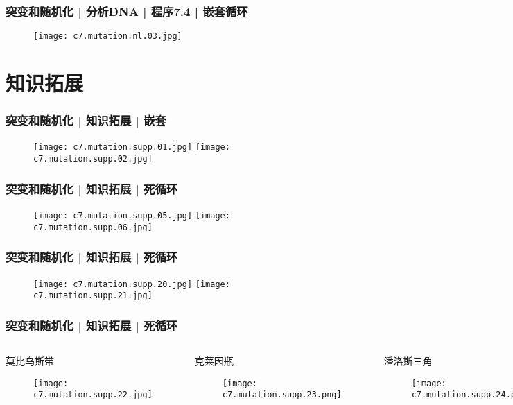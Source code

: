 \begin{frame}
  \frametitle{突变和随机化 | 分析DNA | 程序7.4 | 嵌套循环}
  \begin{figure}
    \centering
    \texttt{[image: c7.mutation.nl.03.jpg]}
  \end{figure}
\end{frame}

\section{知识拓展}
\begin{frame}
  \frametitle{突变和随机化 | 知识拓展 | 嵌套}
  \begin{figure}
    \centering
    \texttt{[image: c7.mutation.supp.01.jpg]}\quad
    \texttt{[image: c7.mutation.supp.02.jpg]}
  \end{figure}
\end{frame}

\begin{frame}
  \frametitle{突变和随机化 | 知识拓展 | 死循环}
  \begin{figure}
    \centering
    \texttt{[image: c7.mutation.supp.05.jpg]}\quad
    \texttt{[image: c7.mutation.supp.06.jpg]}
  \end{figure}
\end{frame}

\begin{frame}
  \frametitle{突变和随机化 | 知识拓展 | 死循环}
  \begin{figure}
    \centering
    \texttt{[image: c7.mutation.supp.20.jpg]}\quad
    \texttt{[image: c7.mutation.supp.21.jpg]}
  \end{figure}
\end{frame}

\begin{frame}
  \frametitle{突变和随机化 | 知识拓展 | 死循环}
  \begin{columns}
    \begin{block}{莫比乌斯带}
      \begin{figure}
        \centering
        \texttt{[image: c7.mutation.supp.22.jpg]}
      \end{figure}
    \end{block}
    \begin{block}{克莱因瓶}
      \begin{figure}
        \centering
        \texttt{[image: c7.mutation.supp.23.png]}
      \end{figure}
    \end{block}
    \begin{block}{潘洛斯三角}
      \begin{figure}
        \centering
        \texttt{[image: c7.mutation.supp.24.png]}
      \end{figure}
    \end{block}
  \end{columns}
\end{frame}

